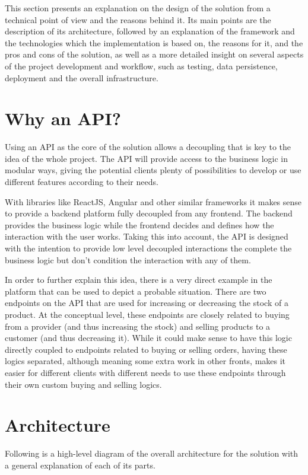 This section presents an explanation on the design of the solution from a technical point of view and the reasons behind it. Its main points are the description of its architecture, followed by an explanation of the framework and the technologies which the implementation is based on, the reasons for it, and the pros and cons of the solution, as well as a more detailed insight on several aspects of the project development and workflow, such as testing, data persistence, deployment and the overall infrastructure.

\section{Why an API?}
Using an API as the core of the solution allows a decoupling that is key to the idea of the whole project. The API will provide access to the business logic in modular ways, giving the potential clients plenty of possibilities to develop or use different features according to their needs.

With libraries like ReactJS, Angular and other similar frameworks it makes sense to provide a backend platform fully decoupled from any frontend. The backend provides the business logic while the frontend decides and defines how the interaction with the user works. Taking this into account, the API is designed with the intention to provide low level decoupled interactions the complete the business logic but don’t condition the interaction with any of them.

In order to further explain this idea, there is a very direct example in the platform that can be used to depict a probable situation. There are two endpoints on the API that are used for increasing or decreasing the stock of a product. At the conceptual level, these endpoints are closely related to buying from a provider (and thus increasing the stock) and selling products to a customer (and thus decreasing it). While it could make sense to have this logic directly coupled to endpoints related to buying or selling orders, having these logics separated, although meaning some extra work in other fronts, makes it easier for different clients with different needs to use these endpoints through their own custom buying and selling logics.

\section{Architecture}
Following is a high-level diagram of the overall architecture for the solution with a general explanation of each of its parts.

